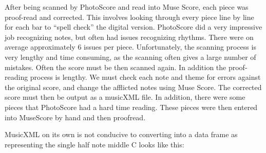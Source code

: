 \documentclass[12pt,twoside]{reedthesis}
\theoremstyle{definition}
\theoremstyle{definition}
\theoremstyle{definition}
\theoremstyle{remark}
\begin{document}
After being scanned by PhotoScore and read into Muse Score, each piece
was proof-read and corrected. This involves looking through every piece
line by line for each bar to ``spell check'' the digital version.
PhotoScore did a very impressive job recognizing notes, but often had
issues recognizing rhythms. There were on average approximately 6 issues
per piece. Unfortunately, the scanning process is very lengthy and time
consuming, as the scanning often gives a large number of mistakes. Often
the score must be then scanned again. In addition the proof-reading
process is lengthy. We must check each note and theme for errors against
the original score, and change the afflicted notes using Muse Score. The
corrected score must then be output as a musicXML file. In addition,
there were some pieces that PhotoScore had a hard time reading. These
pieces were then entered into MuseScore by hand and then proofread.

MusicXML on its own is not conducive to converting into a data frame as
representing the single half note middle C looks like this:
\end{document}
